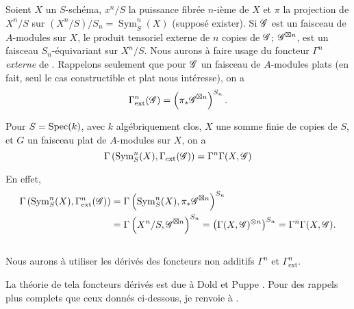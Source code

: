 \documentclass[oneside]{book}
\begin{document}
\subsection{}\label{III:1-2}

Soient $X$ un $S$-sch\'ema, $x^n/S$ la puissance fibr\'ee $n$-i\`eme de $X$ et 
$\pi$ la projection de $X^n/S$ sur $(X^n/S)/S_n=\operatorname{Sym}_S^n(X)$ 
(suppos\'e exister). Si $\mathscr{G}$ est un faisceau de $A$-modules sur $X$, le 
produit tensoriel externe de $n$ copies de $\mathscr{G}$; $\mathscr{G}^{\boxtimes n}$, est un 
faisceau $S_n$-\'equivariant sur $X^n/S$. Nous aurons \`a faire usage du 
foncteur $\Gamma^n$ \emph{externe} de \cite[XVII 5.5.7 \`a 9]{sga4}. Rappelons 
seulement que pour $\mathscr{G}$ un faisceau de $A$-modules plats (en fait, seul le cas 
constructible et plat nous int\'eresse), on a 
\[
  \Gamma_\text{ext}^n(\mathscr{G}) = \left(\pi_*\mathscr{G}^{\boxtimes n}\right)^{S_n} \text{.}
\]





\begin{lemma_}\label{III:1-3}
Pour $S=\operatorname{Spec}(k)$, avec $k$ alg\'ebriquement clos, $X$ une somme finie de 
copies de $S$, et $G$ un faisceau plat de $A$-modules sur $X$, on a 
\[
  \Gamma\left(\operatorname{Sym}_S^n(X),\Gamma_\text{ext}(\mathscr{G})\right) = \Gamma^n \Gamma(X,\mathscr{G})
\]
\end{lemma_}

En effet, 
\begin{align*}
  \Gamma\left(\operatorname{Sym}_S^n(X),\Gamma_\text{ext}^n(\mathscr{G})\right) 
    &= \Gamma\left(\operatorname{Sym}_S^n(X),\pi_*\mathscr{G}^{\boxtimes n}\right)^{S_n} \\
    &= \Gamma\left(X^n/S,\mathscr{G}^{\boxtimes n}\right)^{S_n} 
    = \left(\Gamma(X,\mathscr{G})^{\otimes n}\right)^{S_n} 
    = \Gamma^n \Gamma(X,\mathscr{G}) \text{.}
\end{align*}





\subsection{}\label{III:1-4}

Nous aurons \`a utiliser les d\'eriv\'es des foncteurs non additifs $\Gamma^n$ 
et $\Gamma_\text{ext}^n$. 

La th\'eorie de tela foncteurs d\'eriv\'es est due \`a Dold et Puppe 
\cite{do61}. Pour des rappels plus complets que ceux donn\'es ci-dessous, je 
renvoie \`a \cite[XVII 5.5.3]{sga4}. 
\end{document}
